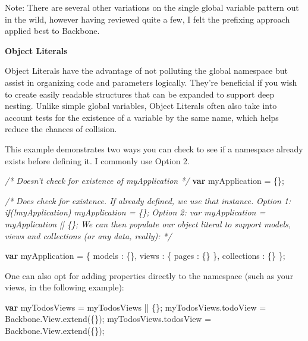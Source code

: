 \documentclass[9pt]{book}
\newenvironment{Shaded}{}{}
\newcommand{\KeywordTok}[1]{\textcolor[rgb]{0.00,0.44,0.13}{\textbf{{#1}}}}
\newcommand{\DataTypeTok}[1]{\textcolor[rgb]{0.56,0.13,0.00}{{#1}}}
\newcommand{\CommentTok}[1]{\textcolor[rgb]{0.38,0.63,0.69}{\textit{{#1}}}}
\newcommand{\OtherTok}[1]{\textcolor[rgb]{0.00,0.44,0.13}{{#1}}}
\newcommand{\FunctionTok}[1]{\textcolor[rgb]{0.02,0.16,0.49}{{#1}}}
\newcommand{\NormalTok}[1]{{#1}}
\begin{document}
Note: There are several other variations on the single global variable
pattern out in the wild, however having reviewed quite a few, I felt the
prefixing approach applied best to Backbone.

\textbf{Object Literals}

Object Literals have the advantage of not polluting the global namespace
but assist in organizing code and parameters logically. They're
beneficial if you wish to create easily readable structures that can be
expanded to support deep nesting. Unlike simple global variables, Object
Literals often also take into account tests for the existence of a
variable by the same name, which helps reduce the chances of collision.

This example demonstrates two ways you can check to see if a namespace
already exists before defining it. I commonly use Option 2.

\begin{Shaded}
\begin{Highlighting}[]
\CommentTok{/* Doesn't check for existence of myApplication */}
\KeywordTok{var} \NormalTok{myApplication = \{\};}

\CommentTok{/*}
\CommentTok{Does check for existence. If already defined, we use that instance.}
\CommentTok{Option 1:   if(!myApplication) myApplication = \{\};}
\CommentTok{Option 2:   var myApplication = myApplication || \{\};}
\CommentTok{We can then populate our object literal to support models, views and collections (or any data, really):}
\CommentTok{*/}

\KeywordTok{var} \NormalTok{myApplication = \{}
    \DataTypeTok{models }\NormalTok{: \{\},}
    \DataTypeTok{views }\NormalTok{: \{}
        \DataTypeTok{pages }\NormalTok{: \{\}}
    \NormalTok{\},}
    \DataTypeTok{collections }\NormalTok{: \{\}}
\NormalTok{\};}
\end{Highlighting}
\end{Shaded}

One can also opt for adding properties directly to the namespace (such
as your views, in the following example):

\begin{Shaded}
\begin{Highlighting}[]
\KeywordTok{var} \NormalTok{myTodosViews = myTodosViews || \{\};}
\OtherTok{myTodosViews}\NormalTok{.}\FunctionTok{todoView} \NormalTok{= }\OtherTok{Backbone}\NormalTok{.}\OtherTok{View}\NormalTok{.}\FunctionTok{extend}\NormalTok{(\{\});}
\OtherTok{myTodosViews}\NormalTok{.}\FunctionTok{todosView} \NormalTok{= }\OtherTok{Backbone}\NormalTok{.}\OtherTok{View}\NormalTok{.}\FunctionTok{extend}\NormalTok{(\{\});}
\end{Highlighting}
\end{Shaded}
\end{document}
